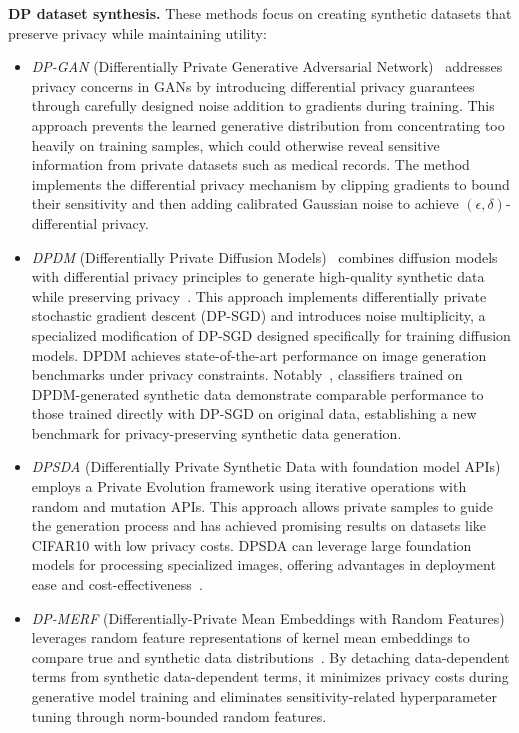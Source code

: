 \documentclass{article}
\begin{document}
\noindent \textbf{DP dataset synthesis.}
These methods focus on creating synthetic datasets that preserve privacy while maintaining utility:

\begin{itemize}[leftmargin=*]

    \item \textit{DP-GAN} (Differentially Private Generative Adversarial Network)~\cite{xie2018differentially} addresses privacy concerns in GANs by introducing differential privacy guarantees through carefully designed noise addition to gradients during training. This approach prevents the learned generative distribution from concentrating too heavily on training samples, which could otherwise reveal sensitive information from private datasets such as medical records. The method implements the differential privacy mechanism by clipping gradients to bound their sensitivity and then adding calibrated Gaussian noise to achieve $(\epsilon, \delta)$-differential privacy. 
    
    \item \textit{DPDM} (Differentially Private Diffusion Models)~\cite{dockhorn2022differentially} combines diffusion models with differential privacy principles to generate high-quality synthetic data while preserving privacy~\cite{majeed2023attribute}. This approach implements differentially private stochastic gradient descent (DP-SGD) and introduces noise multiplicity, a specialized modification of DP-SGD designed specifically for training diffusion models. DPDM achieves state-of-the-art performance on image generation benchmarks under privacy constraints. Notably~\cite{tsai2024differentially}, classifiers trained on DPDM-generated synthetic data demonstrate comparable performance to those trained directly with DP-SGD on original data, establishing a new benchmark for privacy-preserving synthetic data generation.

     \item \textit{DPSDA} (Differentially Private Synthetic Data with foundation model APIs)~\cite{lin2023differentially} employs a Private Evolution framework using iterative operations with random and mutation APIs. This approach allows private samples to guide the generation process and has achieved promising results on datasets like CIFAR10 with low privacy costs. DPSDA can leverage large foundation models for processing specialized images, offering advantages in deployment ease and cost-effectiveness~\cite{xu2024deploying}.
    
    \item \textit{DP-MERF} (Differentially-Private Mean Embeddings with Random Features)~\cite{harder2021dp} leverages random feature representations of kernel mean embeddings to compare true and synthetic data distributions~\cite{muandet2017kernel}. By detaching data-dependent terms from synthetic data-dependent terms, it minimizes privacy costs during generative model training and eliminates sensitivity-related hyperparameter tuning through norm-bounded random features. 
    

\end{itemize}
\end{document}
